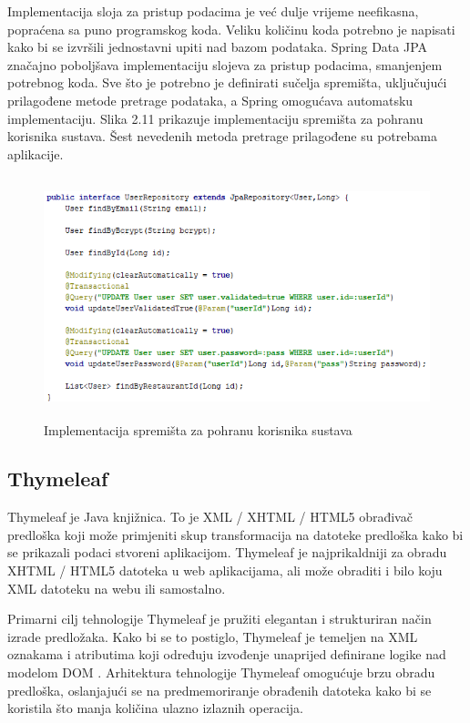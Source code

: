 \documentclass[times, utf8, zavrsni, numeric]{fer}
\begin{document}
Implementacija sloja za pristup podacima je već dulje vrijeme neefikasna, popraćena sa puno programskog koda. Veliku količinu koda potrebno je napisati kako bi se izvršili jednostavni upiti nad bazom podataka. Spring Data JPA značajno poboljšava implementaciju slojeva za pristup podacima, smanjenjem potrebnog koda. Sve što je potrebno je definirati sučelja spremišta, uključujući prilagođene metode pretrage podataka, a Spring omogućava automatsku implementaciju. Slika 2.11 prikazuje implementaciju spremišta za pohranu korisnika sustava. Šest nevedenih metoda pretrage prilagođene su potrebama aplikacije.
\begin{figure}[htb]
\includegraphics[height=7.0cm]{jpa.png}
\caption{Implementacija spremišta za pohranu korisnika sustava}
\label{fig:jpa}
\end{figure}
\subsection{Thymeleaf}
Thymeleaf je Java knjižnica. To je XML / XHTML / HTML5 obrađivač predloška  koji može primjeniti skup transformacija na datoteke predloška kako bi se prikazali podaci stvoreni aplikacijom. Thymeleaf je najprikaldniji za obradu XHTML / HTML5 datoteka u web aplikacijama, ali može obraditi i bilo koju XML datoteku na webu ili samostalno.

Primarni cilj tehnologije Thymeleaf je pružiti elegantan i strukturiran način izrade predložaka. Kako bi se to postiglo, Thymeleaf je temeljen na XML oznakama i atributima koji određuju izvođenje unaprijed definirane logike nad modelom DOM . Arhitektura tehnologije Thymeleaf omogućuje brzu obradu predloška, oslanjajući se na predmemoriranje obrađenih datoteka kako bi se koristila što manja količina ulazno izlaznih operacija.
\end{document}
